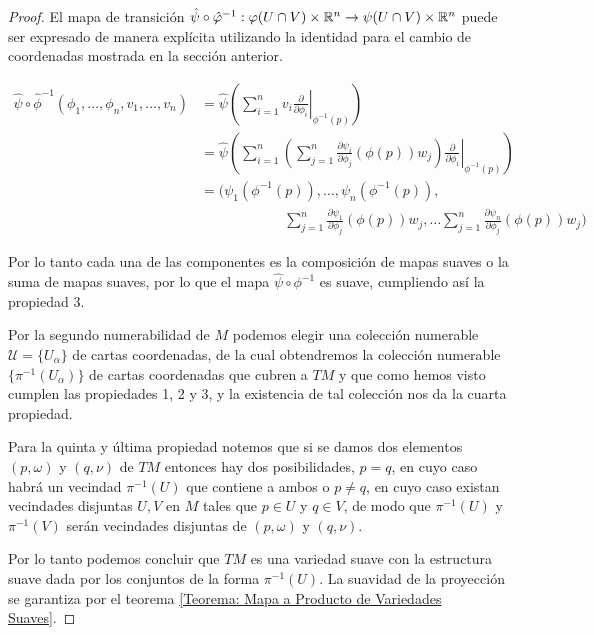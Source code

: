\begin{proof}
	El mapa de transición $\hat{\psi} \circ \hat{\varphi}^{-1}: \varphi(U \cap V) \times \mathbb{R}^n \to \psi(U \cap V) \times \mathbb{R}^n$ puede ser expresado de manera explícita utilizando la identidad para el cambio de coordenadas mostrada en la sección anterior.


	\begin{align*}
		\hat{\psi} \circ \hat{\phi}^{-1}
		(\phi_1, \dots, \phi_n, v_1, \dots, v_n)
		 & =
		\hat{\psi} \left( \left.
		\sum_{i=1}^{n} v_i \frac{\partial}{\partial \phi_i}
		\right|_{\phi^{-1}(p)}\right)                      \\
		 & =
		\hat{\psi}\left(
		\sum_{i=1}^{n}
		\left(
		\sum_{j=1}^{n}
		\frac{\partial \psi_i}{\partial \phi_j} (\phi(p)) w_j
		\right)
		\left.
		\frac{\partial}{\partial \phi_i}
		\right|_{\phi^{-1}(p)}
		\right)
		\\
		 & =
		\Biggl(
		\psi_1(\phi^{-1}(p)), \dots, \psi_n(\phi^{-1}(p)), \\
		 & \quad \hspace{60pt}
		\sum_{j=1}^{n} \frac{\partial \psi_1}{\partial \phi_j}(\phi(p))w_j,
		\dots
		\sum_{j=1}^{n} \frac{\partial \psi_n}{\partial \phi_j}(\phi(p))w_j
		\Biggr)
	\end{align*}

	Por lo tanto cada una de las componentes es la composición de mapas suaves o la suma de mapas suaves, por lo que el mapa $\hat{\psi} \circ \phi^{-1}$ es suave, cumpliendo así la propiedad 3.

	Por la segundo numerabilidad de $M$ podemos elegir una colección numerable $\mathcal{U} = \{U_\alpha\}$ de cartas coordenadas, de la cual obtendremos la colección numerable $\{\pi^{-1}(U_\alpha)\}$ de cartas coordenadas que cubren a $TM$ y que como hemos visto cumplen las propiedades 1, 2 y 3, y la existencia de tal colección nos da la cuarta propiedad.

	Para la quinta y última propiedad notemos que si se damos dos elementos $(p,\omega)$ y $(q, \nu)$ de $TM$ entonces hay dos posibilidades, $p = q$, en cuyo caso habrá un vecindad $\pi^{-1}(U)$ que contiene a ambos o $p \neq q$, en cuyo caso existan vecindades disjuntas $U,V$ en $M$ tales que $p \in U$ y $q \in V$, de modo que $\pi^{-1}(U)$ y $\pi^{-1}(V)$ serán vecindades disjuntas de $(p,\omega)$ y $(q,\nu)$.

	Por lo tanto podemos concluir que $TM$ es una variedad suave con la estructura suave dada por los conjuntos de la forma $\pi^{-1}(U)$. La suavidad de la proyección se garantiza por el teorema \ref{Teorema: Mapa a Producto de Variedades Suaves}.
\end{proof}

